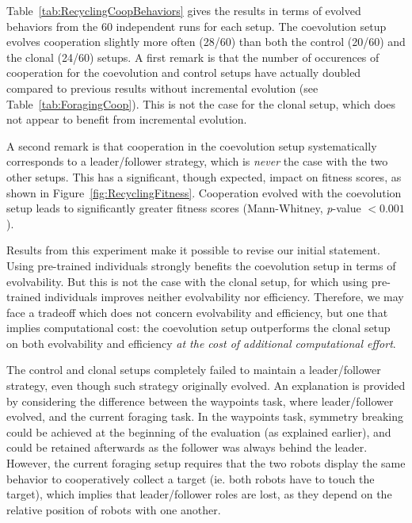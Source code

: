     Table~\ref{tab:RecyclingCoopBehaviors} gives the results in terms of evolved behaviors from the $60$ independent runs for each setup. 
    The coevolution setup evolves cooperation slightly more often (28/60) than both the control (20/60) and the clonal (24/60) setups. 
    A first remark is that the number of occurences of cooperation for the coevolution and control setups have actually doubled compared to previous results without incremental evolution (see Table~\ref{tab:ForagingCoop}). This is not the case for the clonal setup, which does not appear to benefit from incremental evolution. 

    A second remark is that cooperation in the coevolution setup systematically corresponds to a leader/follower strategy, which is \textit{never} the case with the two other setups. This has a significant, though expected, impact on fitness scores, as shown in Figure~\ref{fig:RecyclingFitness}. Cooperation evolved with the coevolution setup leads to significantly greater fitness scores (Mann-Whitney, {\em p}-value $<0.001$). 

    Results from this experiment make it possible to revise our initial statement. Using pre-trained individuals strongly benefits the coevolution setup in terms of evolvability. But this is not the case with the clonal setup, for which using pre-trained individuals improves neither evolvability nor efficiency. Therefore, we may face a tradeoff which does not concern evolvability and efficiency, but one that implies computational cost: the coevolution setup outperforms the clonal setup on both evolvability and efficiency \textit{at the cost of additional computational effort}.

    The control and clonal setups completely failed to maintain a leader/follower strategy, even though such strategy originally evolved. An explanation is provided by considering the difference between the waypoints task, where leader/follower evolved, and the current foraging task. In the waypoints task, symmetry breaking could be achieved at the beginning of the evaluation (as explained earlier), and could be retained afterwards as the follower was always behind the leader. However, the current foraging setup requires that the two robots display the same behavior to cooperatively collect a target (ie. both robots have to touch the target), which implies that leader/follower roles are lost, as they depend on the relative position of robots with one another. 


